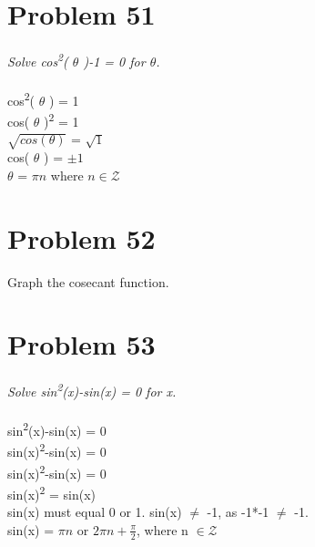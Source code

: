 \documentclass[11pt]{article} %
\begin{document}
{\section{Problem 51} 
\textit{Solve cos\textsuperscript{2}( $\theta$ )-1 = 0 for $\theta$.}
\\
\\ cos\textsuperscript{2}( $\theta$ ) = 1
\\ cos( $\theta$ )\textsuperscript{2} = 1
\\ $\sqrt{cos(\theta)}$ = $\sqrt{1}$
\\ cos( $\theta$ ) = $\pm 1$
\\ $\theta$ = $\pi n$ where $n \in \mathcal{Z}$


\section{Problem 52}
Graph the cosecant function. 
\\ 

\section{Problem 53}
\textit{Solve sin\textsuperscript{2}(x)-sin(x) = 0 for x.}
\\
\\ sin\textsuperscript{2}(x)-sin(x) = 0
\\ sin(x)\textsuperscript{2}-sin(x) = 0
\\ sin(x)\textsuperscript{2}-sin(x) = 0
\\ sin(x)\textsuperscript{2} = sin(x)
\\ sin(x) must equal 0 or 1. sin(x) $\neq$ -1, as -1*-1 $\neq$ -1.
\\ sin(x) = $\pi n$ or $2\pi n + \frac{\pi}{2}$, where n $\in \mathcal{Z}$


}
\end{document}
